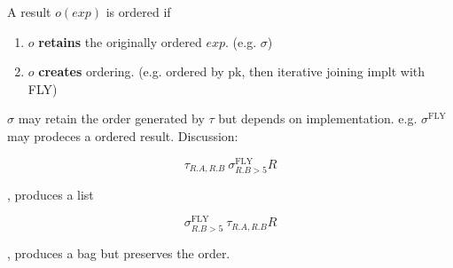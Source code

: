 \documentclass[a4paper]{report}
\begin{document}
\begin{enumerate}
A result $o(exp)$ is ordered if
\begin{enumerate}
\item $o$ \textbf{retains} the originally ordered $exp$. (e.g. $\sigma$)
\item $o$ \textbf{creates} ordering. (e.g. ordered by pk, then iterative joining implt with FLY)
\end{enumerate}
$\sigma$ may retain the order generated by $\tau$ but depends on implementation. e.g. $\sigma^\text{FLY}$ may prodeces a ordered result. Discussion:

$$
\tau_{R.A, R.B}\ \sigma_{R.B>5}^\text{FLY} R
$$
\begin{flushright}, produces a list\end{flushright}
$$
\sigma^\text{FLY}_{R.B>5}\ \tau_{R.A, R.B} R
$$
\begin{flushright}, produces a bag but preserves the order.\end{flushright}
\end{enumerate}
\end{document}
